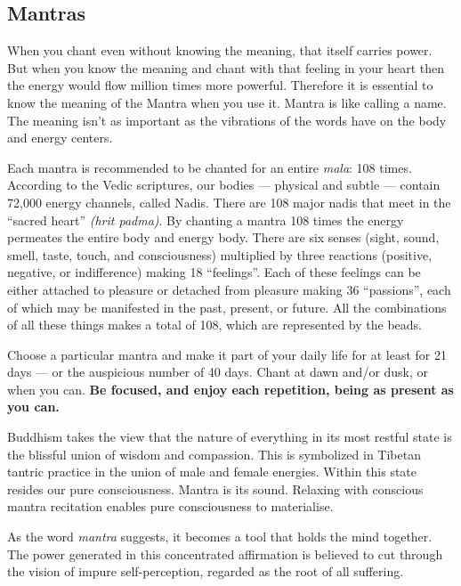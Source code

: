 %

  \subsection*{Mantras}

  When you chant even without knowing the meaning, that itself carries power. But when you know
  the meaning and chant with that feeling in your heart then the energy would flow million times
  more powerful. Therefore it is essential to know the meaning of the Mantra when you use it.
  Mantra is like calling a name. The meaning isn't as important as the vibrations of the words
  have on the body and energy centers.

  Each mantra is recommended to be chanted for an entire \emph{mala}: 108 times. According to the Vedic
  scriptures, our bodies ---  physical and subtle --- contain 72,000 energy channels, called Nadis.
  There are 108 major nadis that meet in the ``sacred heart'' \emph{(hrit padma)}. By chanting a mantra
  108 times the energy permeates the entire body and energy body.  There are six senses (sight,
  sound, smell, taste, touch, and consciousness) multiplied by three reactions (positive,
  negative, or indifference) making 18 ``feelings''. Each of these feelings can be either attached
  to pleasure or detached from pleasure making 36 ``passions'', each of which may be manifested in
  the past, present, or future. All the combinations of all these things makes a total of 108,
  which are represented by the beads.

  Choose a particular mantra and make it part of your daily life for at least for 21 days --- or
  the auspicious number of 40 days. Chant at dawn and/or dusk, or when you can.
  \textbf{Be focused, and enjoy each repetition, being as present as you can.}

  Buddhism takes the view that the nature of everything in its most restful state is the blissful
  union of wisdom and compassion. This is symbolized in Tibetan tantric practice in the union of
  male and female energies. Within this state resides our pure consciousness. Mantra is its sound.
  Relaxing with conscious mantra recitation enables pure consciousness to materialise.

  As the word \emph{mantra} suggests, it becomes a tool that holds the mind together. The power
  generated in this concentrated affirmation is believed to cut through the vision of impure
  self-perception, regarded as the root of all suffering.

